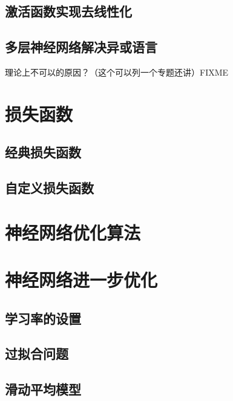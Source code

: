 \documentclass{article} \usepackage{braket} \usepackage{amsmath,amssymb} \usepackage{geometry} \usepackage{graphicx} \usepackage{fancyvrb}\usepackage{braket} \usepackage{bm}\usepackage{hyperref} \usepackage{CJKutf8} \geometry{left=0.2cm,right=0.2cm,top=0.2cm,bottom=0.2cm} \renewcommand{\theequation}{\arabic{section}.\arabic{equation}} \renewcommand{\baselinestretch}{1.5}
\begin{document}
\begin{CJK}{UTF8}{gbsn}
\subsection{激活函数实现去线性化}
\label{sec:org420e81a}

\subsection{多层神经网络解决异或语言}
\label{sec:org32c6c09}

理论上不可以的原因？（这个可以列一个专题还讲）FIXME

\section{损失函数}
\label{sec:org8d79a79}

\subsection{经典损失函数}
\label{sec:org5239194}
\subsection{自定义损失函数}
\label{sec:org2b3e954}

\section{神经网络优化算法}
\label{sec:org90a2418}
\section{神经网络进一步优化}
\label{sec:org5f20e0b}

\subsection{学习率的设置}
\label{sec:org11bb285}

\subsection{过拟合问题}
\label{sec:org9516d59}

\subsection{滑动平均模型}
\label{sec:org8864399}
  
  
\end{CJK}
\end{document}
